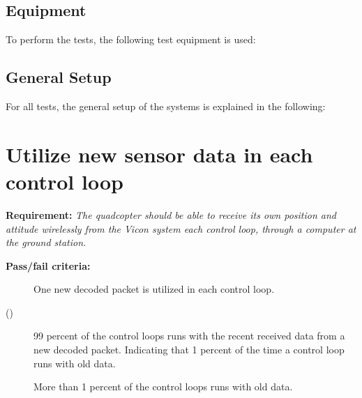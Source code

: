 \subsection*{Equipment}
To perform the tests, the following test equipment is used:
\begin{table}[H] \centering
{}
\caption{Test equipment used for the acceptance test.}
\label{tab:test_equipment}
\end{table}

\subsection*{General Setup}\label{sec:General_setup}
For all tests, the general setup of the systems is explained in the following: 


\section{Utilize new sensor data in each control loop}
\textbf{Requirement:}
\textit{The quadcopter should be able to receive its own position and attitude wirelessly from the Vicon system each control loop, through a computer at the ground station.}

\textbf{Pass/fail criteria:}
	\begin{description}
	\item[  ] One new decoded packet is utilized in each control loop.
	\item[()] 99 percent of the control loops runs with the recent received data from a new decoded packet. Indicating that 1 percent of the time a control loop runs with old data.
	\item[  \phantom{)}] More than 1 percent of the control loops runs with old data.
	\end{description}

